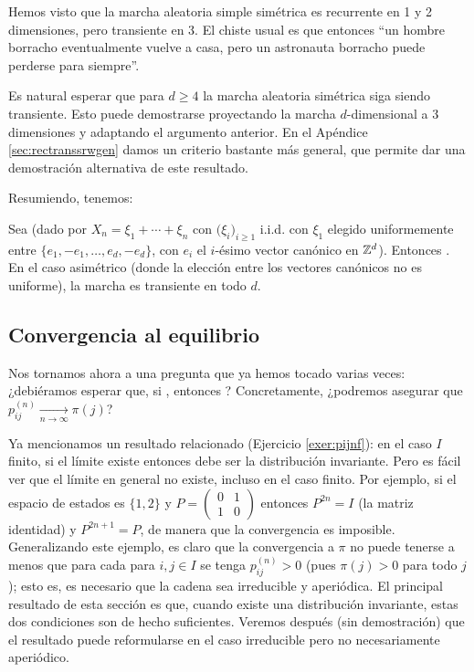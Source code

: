 Hemos visto que la marcha aleatoria simple simétrica es recurrente en 1 y 2 dimensiones, pero transiente en 3.
El chiste usual es que entonces ``un hombre borracho eventualmente vuelve a casa, pero un astronauta borracho puede perderse para siempre''.

Es natural esperar que para $d\geq4$ la marcha aleatoria simétrica siga siendo transiente.
Esto puede demostrarse proyectando la marcha $d$-dimensional a 3 dimensiones y adaptando el argumento anterior.
En el Apéndice \ref{sec:rectranssrwgen} damos un criterio bastante más general, que permite dar una demostración alternativa de este resultado.

Resumiendo, tenemos:

\begin{thm}\label{thm:recSRW}
Sea  (dado por $X_n=\xi_1+\dotsm+\xi_n$ con $\big(\xi_i\big)_{i\geq1}$ i.i.d. con $\xi_1$ elegido uniformemente entre $\{e_1,-e_1,\dotsc,e_d,-e_d\}$, con $e_i$ el $i$-ésimo vector canónico en $\mathbb{Z}^d$).
Entonces .
En el caso asimétrico (donde la elección entre los vectores canónicos no es uniforme), la marcha es transiente en todo $d$.
\end{thm}

\subsection{Convergencia al equilibrio}

Nos tornamos ahora a una pregunta que ya hemos tocado varias veces: ¿debiéramos esperar que, si , entonces ?
Concretamente, ¿podremos asegurar que $p^{(n)}_{ij}\xrightarrow[n\to\infty]{}\pi(j)$?

Ya mencionamos un resultado relacionado (Ejercicio \ref{exer:pijnf}): en el caso $I$ finito, si el límite existe entonces debe ser la distribución invariante.
Pero es fácil ver que el límite en general no existe, incluso en el caso finito.
Por ejemplo, si el espacio de estados es $\{1,2\}$ y $P=\left(\begin{smallmatrix}0 & 1\\1 & 0\end{smallmatrix}\right)$ entonces $P^{2n}=I$ (la matriz identidad) y $P^{2n+1}=P$, de manera que la convergencia es imposible.
Generalizando este ejemplo, es claro que la convergencia a $\pi$ no puede tenerse a menos que para cada para $i,j\in I$ se tenga $p^{(n)}_{ij}>0$ (pues $\pi(j)>0$ para todo $j$); esto es, es necesario que la cadena sea irreducible y aperiódica.
El principal resultado de esta sección es que, cuando existe una distribución invariante, estas dos condiciones son de hecho suficientes.
Veremos después (sin demostración) que el resultado puede reformularse en el caso irreducible pero no necesariamente aperiódico.

